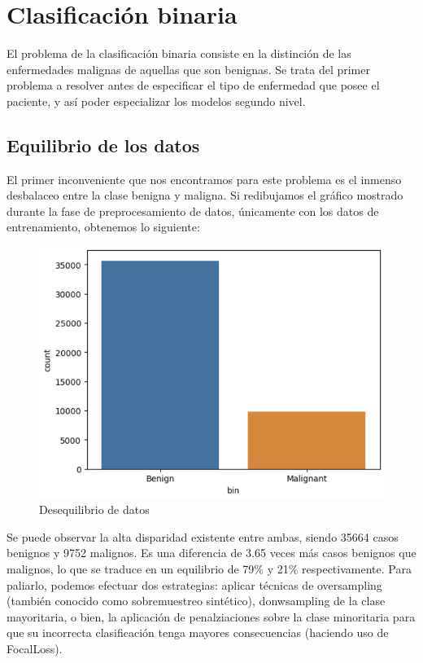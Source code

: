 \section{Clasificación binaria}

El problema de la clasificación binaria consiste en la distinción de las enfermedades malignas de aquellas que son benignas. Se trata del primer problema a resolver antes de especificar el tipo de enfermedad que posee el paciente, y así poder especializar los modelos segundo nivel.

\subsection{Equilibrio de los datos}

El primer inconveniente que nos encontramos para este problema es el inmenso desbalaceo entre la clase benigna y maligna. Si redibujamos el gráfico mostrado durante la fase de preprocesamiento de datos, únicamente con los datos de entrenamiento, obtenemos lo siguiente: 

\begin{figure}[H]
	\centering
	\label {desequilibriototal}
	\includegraphics[scale = 0.4]{imagenes/desequilibriototal.png}
	\caption{Desequilibrio de datos}
\end{figure}

Se puede observar la alta disparidad existente entre ambas, siendo 35664 casos benignos y 9752 malignos. Es una diferencia de 3.65 veces más casos benignos que malignos, lo que se traduce en un equilibrio de  79\% y 21\% respectivamente. Para paliarlo, podemos efectuar dos estrategias: aplicar técnicas de oversampling (también conocido como sobremuestreo sintético), donwsampling de la clase mayoritaria, o bien, la aplicación de penalziaciones sobre la clase minoritaria para que su incorrecta clasificación tenga mayores consecuencias (haciendo uso de FocalLoss).\\

